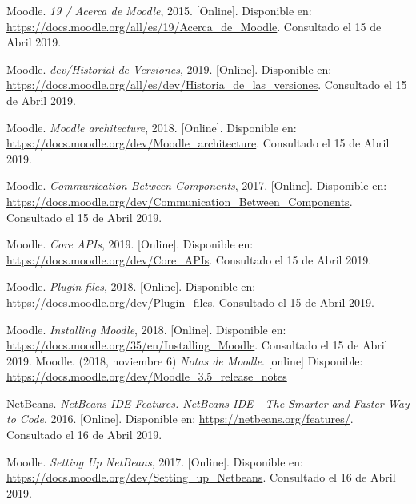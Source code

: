 \begin{thebibliography}{9}
        Moodle. {\it 19 / Acerca de Moodle}, 2015. [Online]. Disponible en: \url{https://docs.moodle.org/all/es/19/Acerca_de_Moodle}. Consultado el 15 de Abril 2019.
    
        Moodle. {\it dev/Historial de Versiones}, 2019. [Online]. Disponible en: \url{https://docs.moodle.org/all/es/dev/Historia_de_las_versiones}. Consultado el 15 de Abril 2019.

        Moodle. {\it Moodle architecture}, 2018. [Online]. Disponible en: \url{https://docs.moodle.org/dev/Moodle_architecture}. Consultado el 15 de Abril 2019.
    
        Moodle. {\it Communication Between Components}, 2017. [Online]. Disponible en: \url{https://docs.moodle.org/dev/Communication_Between_Components}. Consultado el 15 de Abril 2019.
    
        Moodle. {\it Core APIs}, 2019. [Online]. Disponible en: \url{https://docs.moodle.org/dev/Core_APIs}. Consultado el 15 de Abril 2019.
    
        Moodle. {\it Plugin files}, 2018. [Online]. Disponible en: \url{https://docs.moodle.org/dev/Plugin_files}. Consultado el 15 de Abril 2019.

        Moodle. {\it Installing Moodle}, 2018. [Online]. Disponible en: \url{https://docs.moodle.org/35/en/Installing_Moodle}. Consultado el 15 de Abril 2019.
    Moodle. (2018, noviembre 6) \textit{Notas de Moodle}. [online] Disponible:
    \url{https://docs.moodle.org/dev/Moodle_3.5_release_notes}
    
    
        NetBeans. {\it NetBeans IDE Features. NetBeans IDE - The Smarter and Faster Way to Code}, 2016. [Online]. Disponible en: \url{https://netbeans.org/features/}. Consultado el 16 de Abril 2019.
    
        Moodle. {\it Setting Up NetBeans}, 2017. [Online]. Disponible en: \url{https://docs.moodle.org/dev/Setting_up_Netbeans}. Consultado el 16 de Abril 2019.
    

\end{thebibliography}
